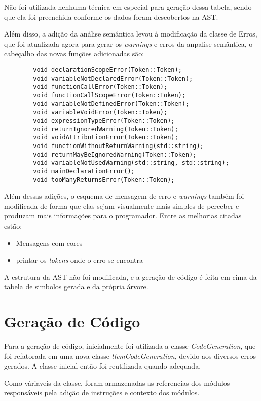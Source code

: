 \documentclass[12pt,a4paper,final]{article}
\begin{document}
Não foi utilizada nenhuma técnica em especial para geração dessa tabela, sendo que ela foi preenchida conforme os dados foram descobertos na AST.

Além disso, a adição da análise semântica levou à modificação da classe de Erros, que foi atualizada agora para gerar os \textit{warnings} e erros da anpalise semântica, o cabeçalho das novas funções adicionadas são:

\begin{lstlisting}
        void declarationScopeError(Token::Token);
        void variableNotDeclaredError(Token::Token);
        void functionCallError(Token::Token);
        void functionCallScopeError(Token::Token);
        void variableNotDefinedError(Token::Token);
        void variableVoidError(Token::Token);
        void expressionTypeError(Token::Token);
        void returnIgnoredWarning(Token::Token);
        void voidAttributionError(Token::Token);
        void functionWithoutReturnWarning(std::string);
        void returnMayBeIgnoredWarning(Token::Token);
        void variableNotUsedWarning(std::string, std::string);
        void mainDeclarationError();
        void tooManyReturnsError(Token::Token);
\end{lstlisting}

Além dessas adições, o esquema de mensagem de erro e \textit{warnings} também foi modificada de forma que elas sejam visualmente mais simples de perceber e produzam mais informações para o programador. Entre as melhorias citadas estão:

\begin{itemize}
\item Mensagens com cores
\item printar os \textit{tokens} onde o erro se encontra
\end{itemize}

A estrutura da AST não foi modificada, e a geração de código é feita em cima da tabela de simbolos gerada e da própria árvore.

\section*{Geração de Código}
Para a geração de código, inicialmente foi utilizada a classe \textit{CodeGeneration}, que foi refatorada em uma nova classe \textit{llvmCodeGeneration}, devido aos diversos erros gerados. A classe inicial então foi reutilizada quando adequada.

Como váriaveis da classe, foram armazenadas as referencias dos módulos responsáveis pela adição de instruções e contexto dos módulos.
\end{document}
